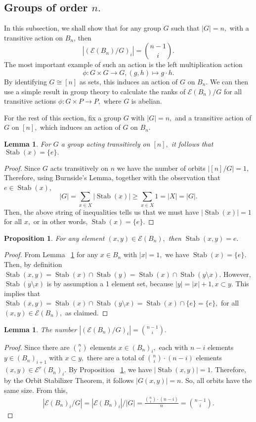 \documentclass[10 pt]{amsart}
\theoremstyle{plain}
\newtheorem{prop}[thm]{Proposition}
\newtheorem{lem}[thm]{Lemma}
\theoremstyle{definition}
\theoremstyle{remark}
\numberwithin{equation}{section}
\newcommand\ssec{\subsection}
\def\Stab{\operatorname{Stab}}
\begin{document}
\ssec{Groups of order $n.$}

In this subsection, we shall show that for any group $G$ such that $|G| = n,$ with a transitive action on $B_n$, then $$|(\mathcal E(B_n)/G)_i| = \binom {n-1}{i}.$$ The most important example of such an action is the left multiplication action $$\phi: G\times G \rightarrow G,(g,h)\mapsto g \cdot h.$$ By identifying $G \cong [n]$ as sets, this induces an action of $G$ on $B_n.$ We can then use a simple result in group theory to calculate the ranks of $\mathcal E(B_n)/G$ for all transitive actions $\phi:G\times P \rightarrow P,$ where $G$ is abelian.

For the rest of this section, fix a group $G$ with $|G| = n,$ and a transitive action of $G$ on $[n],$ which induces an action of $G$ on $B_n.$

\begin{lem}
\label{lem:stabilizer_one}
For $G$ a group acting transitively on $[n],$ it follows that $\Stab(x) = \{e\}.$
\end{lem}
\begin{proof}
Since $G$ acts transitively on $n$ we have the number of orbits $|[n]/G| = 1,$ Therefore, using Burnside's Lemma, together with the observation that $e \in \Stab(x)$,
$$|G| = \sum_{x\in X}|\Stab(x)|\geq \sum_{x \in X} 1=|X|= |G|.$$
Then, the above string of inequalities tells us that we must have $|\Stab(x)| = 1$ for all $x,$ or in other words, $\Stab(x) = \{e\}.$
\end{proof}

\begin{prop}
\label{prop:stabilizer_edge}
For any element $(x , y) \in \mathcal E(B_n),$ then $\Stab(x, y) = e.$
\end{prop}
\begin{proof}
From Lemma ~\ref{lem:stabilizer_one} for any $x \in B_n$ with $|x| = 1,$ we have $\Stab(x) = \{e\}.$ Then, by definition $\Stab(x, y) = \Stab(x) \cap \Stab(y) = \Stab(x) \cap \Stab(y \setminus x).$ However, $\Stab(y \setminus x)$ is by assumption a 1 element set, because $|y| = |x| +1,x \subset y.$ This implies that $\Stab(x, y)=\Stab(x) \cap \Stab(y \setminus x) = \Stab(x) \cap \{e\} = \{e\},$ for all $(x, y) \in \mathcal E(B_n),$ as claimed.
\end{proof}

\begin{lem}
\label{lem:q_counts}
The number $\displaystyle |(\mathcal E(B_n)/G)_i| = \binom{n-1}{i}.$
\end{lem}
\begin{proof}
Since there are $\binom{n}{i}$ elements $x\in(B_n)_i,$ each with $n-i$ elements $y \in (B_n)_{i+1}$ with $x \subset y,$ there are a total of $\binom{n}{i}\cdot (n-i)$ elements $(x, y) \in \mathcal E^r(B_n)_i.$ By Proposition ~\ref{prop:stabilizer_edge}, we have $|\Stab(x, y)| = 1.$ Therefore, by the Orbit Stabilizer Theorem, it follows $|G(x, y)| = n.$ So, all orbits have the same size. From this,
\begin{align*}
|\mathcal E(B_n)_i/G| = |\mathcal E(B_n)_i|/|G| = \frac{\binom{n}{i}\cdot (n-i)}{n} = \binom {n-1}{i}.
\end{align*}
\end{proof}
\end{document}
